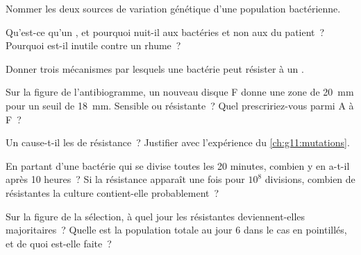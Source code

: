 \begin{exercise}[$\star$]\label{exo:g11:antibiotic-resistance:1}
Nommer les deux sources de variation génétique d'une population
bactérienne.
\end{exercise}

\begin{exercise}[$\star$]\label{exo:g11:antibiotic-resistance:2}
Qu'est-ce qu'un , et pourquoi nuit-il aux bactéries et non
aux  du patient~? Pourquoi est-il inutile contre un rhume~?
\end{exercise}

\begin{exercise}[$\star$]\label{exo:g11:antibiotic-resistance:3}
Donner trois mécanismes par lesquels une bactérie peut résister à un
.
\end{exercise}

\begin{exercise}[$\star$]\label{exo:g11:antibiotic-resistance:4}
Sur la figure de l'antibiogramme, un nouveau disque F donne une zone de
\qty{20}{mm} pour un seuil de \qty{18}{mm}. Sensible ou résistante~?
Quel  prescririez-vous parmi A à F~?
\end{exercise}

\begin{exercise}[$\star$]\label{exo:g11:antibiotic-resistance:5}
Un  cause-t-il les  de résistance~? Justifier avec
l'expérience du \cref{ch:g11:mutations}.
\end{exercise}

\begin{exercise}[$\star\star$]\label{exo:g11:antibiotic-resistance:6}
En partant d'une bactérie qui se divise toutes les 20 minutes, combien
y en a-t-il après 10 heures~? Si la résistance apparaît une fois pour
$10^8$ divisions, combien de  résistantes la culture
contient-elle probablement~?
\end{exercise}

\begin{exercise}[$\star\star$]\label{exo:g11:antibiotic-resistance:7}
Sur la figure de la sélection, à quel jour les  résistantes
deviennent-elles majoritaires~? Quelle est la population totale au jour
6 dans le cas en pointillés, et de quoi est-elle faite~?
\end{exercise}

